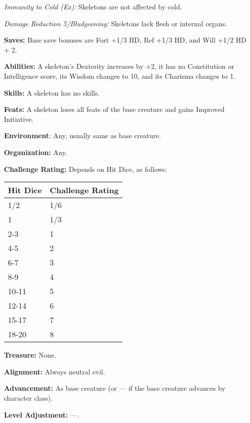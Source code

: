 \documentclass{article}
\begin{document}
\textit{Immunity to Cold (Ex): }Skeletons are not affected by cold.

\textit{Damage Reduction 5/Bludgeoning: }Skeletons lack flesh or internal organs.

\textbf{Saves:} Base save bonuses are Fort +1/3 HD, Ref +1/3 HD, and Will +1/2 
HD + 2.

\textbf{Abilities:} A skeleton's Dexterity increases by +2, it has no Constitution 
or Intelligence score, its Wisdom changes to 10, and its Charisma changes to 1.

\textbf{Skills:} A skeleton has no skills.

\textbf{Feats: }A skeleton loses all feats of the base creature and gains Improved 
Initiative.

\textbf{Environment}: Any, usually same as base creature.

\textbf{Organization:} Any.

\textbf{Challenge Rating:} Depends on Hit Dice, as follows:

\begin{tabular}{|>{\raggedright}p{34pt}|>{\raggedright}p{73pt}|}
\hline
H\textbf{it Dice} & C\textbf{hallenge Rating}\tabularnewline
\hline
1/2 & 1/6\tabularnewline
\hline
1 & 1/3\tabularnewline
\hline
2-3 & 1\tabularnewline
\hline
4-5 & 2\tabularnewline
\hline
6-7 & 3\tabularnewline
\hline
8-9 & 4\tabularnewline
\hline
10-11 & 5\tabularnewline
\hline
12-14 & 6\tabularnewline
\hline
15-17 & 7\tabularnewline
\hline
18-20 & 8\tabularnewline
\hline
\end{tabular}

\textbf{Treasure: }None.

\textbf{Alignment: }Always neutral evil.

\textbf{Advancement: }As base creature (or --- if the base creature advances by 
character class).

\textbf{Level Adjustment:} ---.
\end{document}
